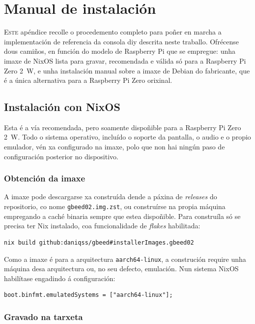 \chapter{Manual de instalación}
\label{chap:manual-instalacion}

\lettrine{E}{ste} apéndice recolle o procedemento completo para poñer en marcha a implementación de referencia
da consola \acrshort{diy} descrita neste traballo. Ofrécense dous camiños, en función do modelo de Raspberry Pi
que se empregue: unha imaxe de NixOS lista para gravar, recomendada e válida só para a Raspberry Pi Zero 2~W,
e unha instalación manual sobre a imaxe de Debian do fabricante, que é a única alternativa para a Raspberry Pi Zero orixinal.


\section{Instalación con NixOS}

Esta é a vía recomendada, pero soamente dispoñible para a Raspberry Pi Zero 2~W. Todo o sistema operativo, incluído o soporte da pantalla, o audio e o propio
emulador, vén xa configurado na imaxe, polo que non hai ningún paso de configuración posterior no dispositivo.

\subsection{Obtención da imaxe}

A imaxe pode descargarse xa construída dende a páxina de \textit{releases} do repositorio, co nome
\texttt{gbeed02.img.zst}, ou construírse na propia máquina empregando a caché binaria sempre que estea dispoñible.
Para construíla só se precisa ter Nix instalado, coa funcionalidade de \textit{flakes} habilitada:

\begin{lstlisting}[language=bash]
nix build github:daniqss/gbeed#installerImages.gbeed02
\end{lstlisting}

Como a imaxe é para a arquitectura \texttt{aarch64-linux}, a construción require unha máquina desa arquitectura
ou, no seu defecto, emulación. Nun sistema NixOS habilítase engadindo á configuración:

\begin{lstlisting}
boot.binfmt.emulatedSystems = ["aarch64-linux"];
\end{lstlisting}

\subsection{Gravado na tarxeta}

